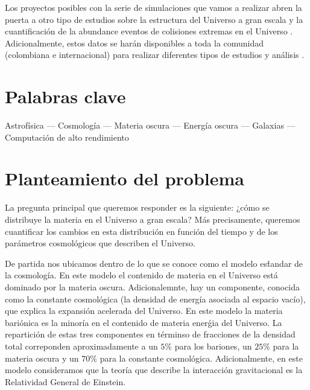 \documentclass[12pt]{article}
\begin{document}
Los proyectos posibles con la serie de simulaciones que vamos a
realizar abren la puerta a otro tipo de estudios sobre la estructura
del Universo a gran escala \cite{Tweb,Vweb} y la cuantificaci\'on de
la abundance eventos de colisiones extremas en el Universo
\cite{Bullets2010,Bullets2014}. Adicionalmente, estos datos se
har\'an disponibles a toda la comunidad (colombiana e internacional)
para realizar diferentes tipos de estudios y an\'alisis \cite{Multidark}. 




\section{Palabras clave}

Astrof\'isica --- Cosmolog\'ia --- Materia oscura --- Energ\'ia oscura
--- Galaxias --- Computaci\'on de alto rendimiento 



\section{Planteamiento del problema}

La pregunta principal que queremos responder es la siguiente: ¿cómo se
distribuye la materia en el Universo a gran escala? M\'as precisamente,
queremos cuantificar los cambios en esta distribuci\'on en funci\'on
del tiempo y de los par\'ametros cosmol\'ogicos que describen el
Universo.

De partida nos ubicamos dentro de lo que se conoce como el modelo
es\'tandar de la cosmolog\'ia. En este modelo el contenido de materia
en el Universo est\'a dominado por la materia oscura. Adicionalemnte,
hay un componente, conocida como la constante cosmol\'ogica (la
densidad de energ\'ia asociada al espacio vac\'io), que explica la
expansi\'on acelerada del Universo. En este modelo la materia
bari\'onica es la minor\'ia en el contenido de materia ener\'gia del
Universo. La repartici\'on de estas tres componentes en t\'erminso de
fracciones de la densidad total correponden aproximadamente a un $5\%$
para los bariones, un $25\%$ para la materia oscura y un $70\%$ para
la constante cosmol\'ogica. Adicionalmente, en este modelo
consideramos que la teor\'ia que describe la interacci\'on
gravitacional es la Relatividad General de Einstein.
\end{document}
